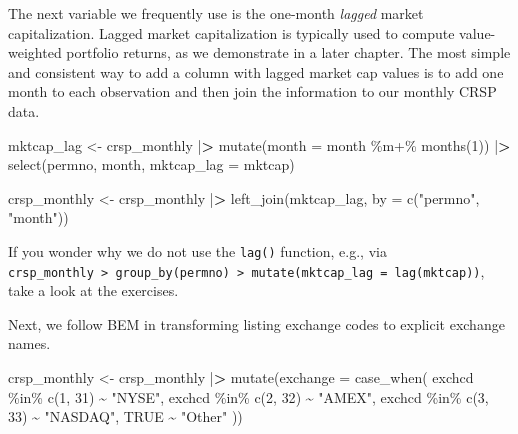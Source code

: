 \documentclass[
]{book}
\newenvironment{Shaded}{\begin{snugshade}}{\end{snugshade}}
\newcommand{\AttributeTok}[1]{\textcolor[rgb]{0.61,0.61,0.61}{#1}}
\newcommand{\ConstantTok}[1]{\textcolor[rgb]{0,0,0}{#1}}
\newcommand{\DecValTok}[1]{\textcolor[rgb]{0.06,0.06,0.06}{#1}}
\newcommand{\ErrorTok}[1]{\textcolor[rgb]{0.14,0.14,0.14}{\textbf{#1}}}
\newcommand{\FunctionTok}[1]{\textcolor[rgb]{0,0,0}{#1}}
\newcommand{\NormalTok}[1]{#1}
\newcommand{\OtherTok}[1]{\textcolor[rgb]{0.37,0.37,0.37}{#1}}
\newcommand{\SpecialCharTok}[1]{\textcolor[rgb]{0,0,0}{#1}}
\newcommand{\StringTok}[1]{\textcolor[rgb]{0.5,0.5,0.5}{#1}}
\begin{document}
The next variable we frequently use is the one-month \emph{lagged} market capitalization. Lagged market capitalization is typically used to compute value-weighted portfolio returns, as we demonstrate in a later chapter. The most simple and consistent way to add a column with lagged market cap values is to add one month to each observation and then join the information to our monthly CRSP data.

\begin{Shaded}
\begin{Highlighting}[]
\NormalTok{mktcap\_lag }\OtherTok{\textless{}{-}}\NormalTok{ crsp\_monthly }\SpecialCharTok{|}\ErrorTok{\textgreater{}}
  \FunctionTok{mutate}\NormalTok{(}\AttributeTok{month =}\NormalTok{ month }\SpecialCharTok{\%m+\%} \FunctionTok{months}\NormalTok{(}\DecValTok{1}\NormalTok{)) }\SpecialCharTok{|}\ErrorTok{\textgreater{}}
  \FunctionTok{select}\NormalTok{(permno, month, }\AttributeTok{mktcap\_lag =}\NormalTok{ mktcap)}

\NormalTok{crsp\_monthly }\OtherTok{\textless{}{-}}\NormalTok{ crsp\_monthly }\SpecialCharTok{|}\ErrorTok{\textgreater{}}
  \FunctionTok{left\_join}\NormalTok{(mktcap\_lag, }\AttributeTok{by =} \FunctionTok{c}\NormalTok{(}\StringTok{"permno"}\NormalTok{, }\StringTok{"month"}\NormalTok{))}
\end{Highlighting}
\end{Shaded}

If you wonder why we do not use the \texttt{lag()} function, e.g., via \texttt{crsp\_monthly\ \textbar{}\textgreater{}\ group\_by(permno)\ \textbar{}\textgreater{}\ mutate(mktcap\_lag\ =\ lag(mktcap))}, take a look at the exercises.

Next, we follow BEM in transforming listing exchange codes to explicit exchange names.

\begin{Shaded}
\begin{Highlighting}[]
\NormalTok{crsp\_monthly }\OtherTok{\textless{}{-}}\NormalTok{ crsp\_monthly }\SpecialCharTok{|}\ErrorTok{\textgreater{}}
  \FunctionTok{mutate}\NormalTok{(}\AttributeTok{exchange =} \FunctionTok{case\_when}\NormalTok{(}
\NormalTok{    exchcd }\SpecialCharTok{\%in\%} \FunctionTok{c}\NormalTok{(}\DecValTok{1}\NormalTok{, }\DecValTok{31}\NormalTok{) }\SpecialCharTok{\textasciitilde{}} \StringTok{"NYSE"}\NormalTok{,}
\NormalTok{    exchcd }\SpecialCharTok{\%in\%} \FunctionTok{c}\NormalTok{(}\DecValTok{2}\NormalTok{, }\DecValTok{32}\NormalTok{) }\SpecialCharTok{\textasciitilde{}} \StringTok{"AMEX"}\NormalTok{,}
\NormalTok{    exchcd }\SpecialCharTok{\%in\%} \FunctionTok{c}\NormalTok{(}\DecValTok{3}\NormalTok{, }\DecValTok{33}\NormalTok{) }\SpecialCharTok{\textasciitilde{}} \StringTok{"NASDAQ"}\NormalTok{,}
    \ConstantTok{TRUE} \SpecialCharTok{\textasciitilde{}} \StringTok{"Other"}
\NormalTok{  ))}
\end{Highlighting}
\end{Shaded}
\end{document}
